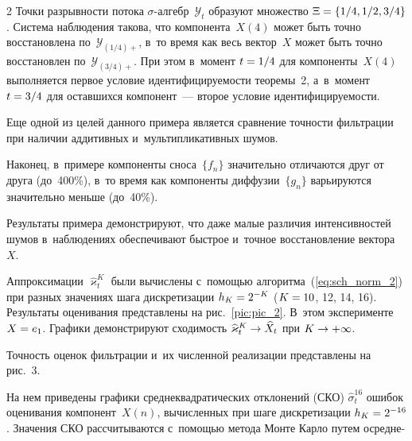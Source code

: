 \begin{multicols}{2}
Точки разрывности потока $\sigma$-ал\-гебр~$\mathcal{Y}_t$ образуют множество 
$\Xi\hm=\left\{{1}/{4},{1}/{2},{3}/{4}\right\}$.
Система наблюдения такова, что компонента~$X(4)$ может быть точно восстановлена 
по~$\mathcal{Y}_{({1}/{4})+}$,
в~то время как весь вектор~$X$ может быть точно восстановлен 
по~$\mathcal{Y}_{({3}/{4})+}$. При этом в~момент $t\hm={1}/{4}$ для компоненты~$X(4)$ 
выполняется первое условие идентифицируемости теоремы~2, а~в~момент 
$t\hm={3}/{4}$ для оставшихся компонент~--- второе условие идентифицируемости.

Еще одной из целей данного примера является 
сравнение точности фильтрации при наличии аддитивных и~мультипликативных шумов.

Наконец, в~примере компоненты сноса~$\{f_n\}$ значительно отличаются друг 
от друга (до~400\%), в~то время как компоненты диффузии~$\{g_n\}$ варьируются 
значительно меньше (до~40\%).

Результаты примера демонстрируют, что даже малые различия интенсивностей шумов 
в~наблюдениях
обеспечивают быстрое и~точное восстановление вектора~$X$.

Аппроксимации $\widehat{\varkappa}_t^K$ были вычислены с~по\-мощью 
алгоритма~(\ref{eq:sch_norm_2}) при разных значениях шага дискретизации 
$h_K\hm=2^{-K}$ ($K\hm=10$, 12, 14, 16).
Результаты оценивания представлены на рис.~\ref{pic:pic_2}. В~этом эксперименте 
$X\hm=e_1$. Графики демонстрируют сходимость $\widehat{\varkappa}_t^K \hm\to 
\widehat{X}_t$ при $K\hm \to +\infty$.


Точность оценок фильтрации и~их численной реализации представлены на 
рис.~3.

На нем приведены графики среднеквадратических отклонений (СКО)
$\widehat{\sigma}^{16}_t$  ошибок оценивания компонент~$X(n)$, вычисленных 
при шаге дискретизации $h_K\hm=2^{-16}$. Значения СКО рассчитываются
 с~помощью 
метода Мон\-те Кар\-ло путем осредне-\linebreak\vspace*{-12pt}

\pagebreak

\end{multicols}

\begin{figure*} %
\vspace*{1pt}
\begin{center}
\mbox{%
\epsfxsize=146.393mm
}
\end{center}
\vspace*{-9pt}
\label{pic:pic_2}
\vspace*{5pt}
\end{figure*}



